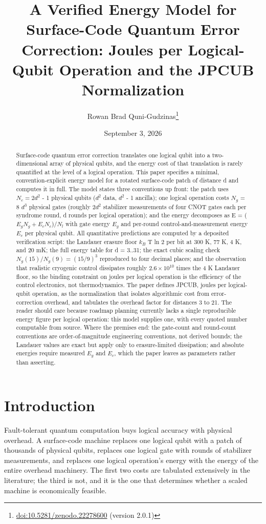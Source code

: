 \documentclass[11pt]{article}
\title{A Verified Energy Model for Surface-Code Quantum Error Correction: Joules per Logical-Qubit Operation and the JPCUB Normalization}
\author{Rowan Brad Quni-Gudzinas\thanks{\href{https://doi.org/10.5281/zenodo.22278600}{doi:10.5281/zenodo.22278600} (version 2.0.1)}}
\date{September 3, 2026}
\begin{document}
\maketitle
\begin{abstract}
Surface-code quantum error correction translates one logical qubit into a two-dimensional array of physical qubits, and the energy cost of that translation is rarely quantified at the level of a logical operation. This paper specifies a minimal, convention-explicit energy model for a rotated surface-code patch of distance d and computes it in full. The model states three conventions up front: the patch uses $N_{c} = 2d^{2}$ - 1 physical qubits ($d^{2}$ data, $d^{2}$ - 1 ancilla); one logical operation costs $N_{g}$ = 8 $d^{3}$ physical gates (roughly $2d^{2}$ stabilizer measurements of four CNOT gates each per syndrome round, d rounds per logical operation); and the energy decomposes as E = ($E_{g}   N_{g} + E_{c}   N_{c}$)/$N_{l}$ with gate energy $E_{g}$ and per-round control-and-measurement energy $E_{c}$ per physical qubit. All quantitative predictions are computed by a deposited verification script: the Landauer erasure floor $k_{B}$ T ln 2 per bit at 300 K, 77 K, 4 K, and 20 mK; the full energy table for d = 3..31; the exact cubic scaling check $N_{g}(15) / N_{g}(9) = (15/9)^{3}$ reproduced to four decimal places; and the observation that realistic cryogenic control dissipates roughly $2.6\times 10^{10}$ times the 4 K Landauer floor, so the binding constraint on joules per logical operation is the efficiency of the control electronics, not thermodynamics. The paper defines JPCUB, joules per logical-qubit operation, as the normalization that isolates algorithmic cost from error-correction overhead, and tabulates the overhead factor for distances 3 to 21. The reader should care because roadmap planning currently lacks a single reproducible energy figure per logical operation: this model supplies one, with every quoted number computable from source. Where the premises end: the gate-count and round-count conventions are order-of-magnitude engineering conventions, not derived bounds; the Landauer values are exact but apply only to erasure-limited dissipation; and absolute energies require measured $E_{g}$ and $E_{c}$, which the paper leaves as parameters rather than asserting.
\end{abstract}
\section{Introduction}
Fault-tolerant quantum computation buys logical accuracy with physical overhead. A surface-code machine replaces one logical qubit with a patch of thousands of physical qubits, replaces one logical gate with rounds of stabilizer measurements, and replaces one logical operation's energy with the energy of the entire overhead machinery. The first two costs are tabulated extensively in the literature; the third is not, and it is the one that determines whether a scaled machine is economically feasible.
\end{document}
